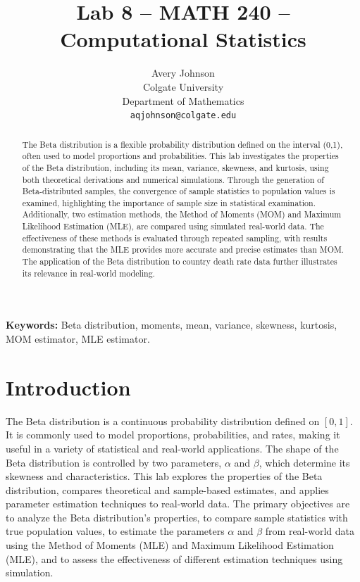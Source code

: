 \documentclass{article}\usepackage[]{graphicx}\usepackage[]{xcolor}
\begin{document}
\vspace{-1in}
\title{Lab 8 -- MATH 240 -- Computational Statistics}

\author{
  Avery Johnson \\
  Colgate University  \\
  Department of Mathematics  \\
  {\tt aqjohnson@colgate.edu}
}

\date{}

\maketitle

\begin{multicols}{2}
\begin{abstract}
The Beta distribution is a flexible probability distribution defined on the interval (0,1), often used to model proportions and probabilities. This lab investigates the properties of the Beta distribution, including its mean, variance, skewness, and kurtosis, using both theoretical derivations and numerical simulations. Through the generation of Beta-distributed samples, the convergence of sample statistics to population values is examined, highlighting the importance of sample size in statistical examination. Additionally, two estimation methods, the Method of Moments (MOM) and Maximum Likelihood Estimation (MLE), are compared using simulated real-world data. The effectiveness of these methods is evaluated through repeated sampling, with results demonstrating that the MLE provides more accurate and precise estimates than MOM. The application of the Beta distribution to country death rate data further illustrates its relevance in real-world modeling. 

\end{abstract}

\noindent \textbf{Keywords:} 
Beta distribution, moments, mean, variance, skewness, kurtosis, MOM estimator, MLE estimator.

\section{Introduction}
The Beta distribution is a continuous probability distribution defined on $[0,1]$. It is commonly used to model proportions, probabilities, and rates, making it useful in a variety of statistical and real-world applications. The shape of the Beta distribution is controlled by two parameters, $\alpha$ and $\beta$, which determine its skewness and characteristics. This lab explores the properties of the Beta distribution, compares theoretical and sample-based estimates, and applies parameter estimation techniques to real-world data. The primary objectives are to analyze the Beta distribution's properties, to compare sample statistics with true population values, to estimate the parameters $\alpha$ and $\beta$ from real-world data using the Method of Moments (MLE) and Maximum Likelihood Estimation (MLE), and to assess the effectiveness of different estimation techniques using simulation.


\end{multicols}
\end{document}
